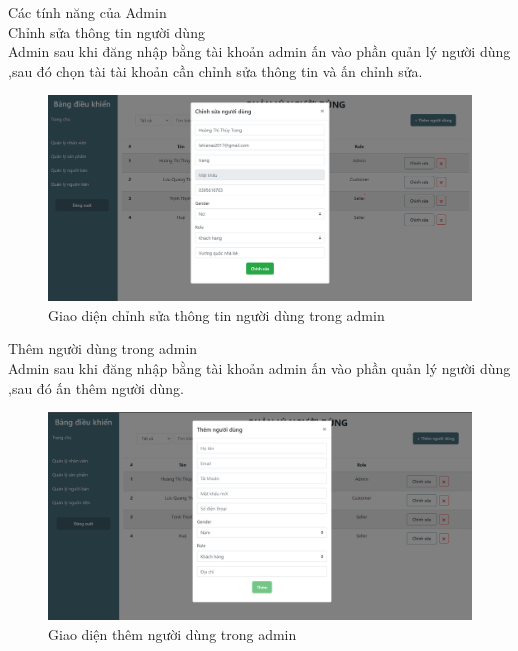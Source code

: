 \documentclass{article}
\begin{document}
{{{{{{{{{{{{{{{{{\begin{center}
\begin{figure}[htp]
		\end{figure}
	\end{center}
}
\newpage
{\large Các tính năng của Admin\\
	\indent Chỉnh sửa thông tin người dùng\\
	{\large
	Admin sau khi đăng nhập bằng tài khoản admin ấn vào phần quản lý người dùng ,sau đó chọn tài tài khoản cần chỉnh sửa thông tin và ấn chỉnh sửa.}
	\begin{center}
		\begin{figure}[htp]
			\begin{center}
				\includegraphics[scale=.400]{anh40.png}
			\end{center}
			\caption{Giao diện chỉnh sửa thông tin người dùng trong admin}
			
		\end{figure}
	\end{center}
}
\newpage
{\large 
	\indent	Thêm người dùng trong admin\\
		{\large
			Admin sau khi đăng nhập bằng tài khoản admin ấn vào phần quản lý người dùng ,sau đó ấn thêm người dùng.}
	\begin{center}
		\begin{figure}[htp]
			\begin{center}
				\includegraphics[scale=.400]{anh47.png}
			\end{center}
			\caption{Giao diện thêm người dùng trong admin}
			

\end{figure}
\end{center}}}}}}}}}}}}}}}}}}
\end{document}
